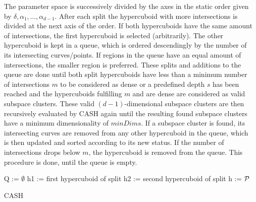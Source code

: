 The parameter space is successively divided by the axes in the static order given by $\delta,\alpha_1,\dotsc,\alpha_{d-1}$. After each split the hypercuboid with more intersections is divided at the next axis of the order. If both hypercuboids have the same amount of intersections, the first hypercuboid is selected (arbitrarily). The other hypercuboid is kept in a queue, which is ordered descendingly by the number of its intersecting curves/points. If regions in the queue have an equal amount of intersections, the smaller region is preferred. These splits and additions to the queue are done until both split hypercuboids have less than a minimum number of intersections $m$ to be considered as dense or a predefined depth $s$ has been reached and the hypercuboids fulfilling $m$ and are dense are considered as valid subspace clusters. These valid $(d-1)$-dimensional subspace clusters are then recursively evaluated by CASH again until the resulting found subspace clusters have a minimum dimensionality of $minDims$. If a subspace cluster is found, its intersecting curves are removed from any other hypercuboid in the queue, which is then updated and sorted according to its new status. If the number of intersections drops below $m$, the hypercuboid is removed from the queue. This procedure is done, until the queue is empty.

\vspace{5mm}
\begin{algorithm}[H]
\SetAlgoLined
{}
Q := $\emptyset$\;     
h1 := first hypercuboid of split\;
h2 := second hypercuboid of split\;
h := $\mathcal{P}$

 \caption{CASH}
\end{algorithm}
\vspace{5mm}

